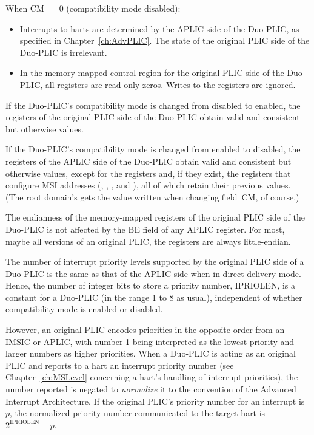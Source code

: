 When CM~=~0 (compatibility mode disabled):
\begin{itemize}

\item
Interrupts to harts are determined by the APLIC side of the
\mbox{Duo-PLIC}, as specified in Chapter~\ref{ch:AdvPLIC}.
The state of the original PLIC side of the \mbox{Duo-PLIC} is
irrelevant.

\item
In the memory-mapped control region for the original PLIC side of the
\mbox{Duo-PLIC}, all registers are read-only zeros.
Writes to the registers are ignored.

\end{itemize}

If the \mbox{Duo-PLIC}'s compatibility mode is changed from disabled to
enabled, the registers of the original PLIC side of the \mbox{Duo-PLIC}
obtain valid and consistent but otherwise {\unspecified} values.

If the \mbox{Duo-PLIC}'s compatibility mode is changed from
enabled to disabled, the registers of the APLIC side of
the \mbox{Duo-PLIC} obtain valid and consistent but otherwise
{\unspecified} values, except for the  registers
and, if they exist, the registers that configure MSI addresses
(, , , and
), all of which retain their previous values.
(The root domain's  gets the value written when changing
field~CM, of course.)

The endianness of the memory-mapped registers of the original PLIC side
of the \mbox{Duo-PLIC} is not affected by the BE field of any
APLIC  register.
For most, maybe all versions of an original PLIC, the registers are
always little-endian.

The number of interrupt priority levels supported by the original PLIC
side of a \mbox{Duo-PLIC} is the same as that of the APLIC side
when in direct delivery mode.
Hence, the number of integer bits to store a priority number, IPRIOLEN,
is a constant for a \mbox{Duo-PLIC} (in the range 1 to 8 as usual),
independent of whether compatibility mode is enabled or disabled.

However, an original PLIC encodes priorities in the opposite order
from an IMSIC or APLIC, with number 1 being interpreted as the
lowest priority and larger numbers as higher priorities.
When a \mbox{Duo-PLIC} is acting as an original PLIC and reports to
a hart an interrupt priority number (see Chapter~\ref{ch:MSLevel}
concerning a hart's handling of interrupt priorities), the number
reported is negated to \emph{normalize} it to the convention of the
Advanced Interrupt Architecture.
If the original PLIC's priority number for an interrupt is~$p$,
the normalized priority number communicated to the target hart is
${\mbox{2}^\textrm{IPRIOLEN}-p}$.

